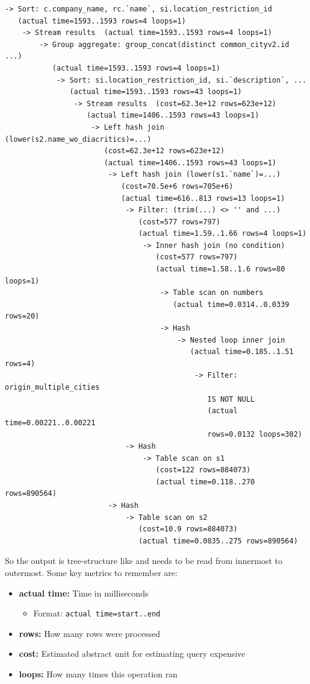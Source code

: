 \documentclass[11pt]{article}
\begin{document}
\begin{verbatim}
-> Sort: c.company_name, rc.`name`, si.location_restriction_id
   (actual time=1593..1593 rows=4 loops=1)
    -> Stream results  (actual time=1593..1593 rows=4 loops=1)
        -> Group aggregate: group_concat(distinct common_cityv2.id ...)
           (actual time=1593..1593 rows=4 loops=1)
            -> Sort: si.location_restriction_id, si.`description`, ...
               (actual time=1593..1593 rows=43 loops=1)
                -> Stream results  (cost=62.3e+12 rows=623e+12)
                   (actual time=1406..1593 rows=43 loops=1)
                    -> Left hash join (lower(s2.name_wo_diacritics)=...)
                       (cost=62.3e+12 rows=623e+12)
                       (actual time=1406..1593 rows=43 loops=1)
                        -> Left hash join (lower(s1.`name`)=...)
                           (cost=70.5e+6 rows=705e+6)
                           (actual time=616..813 rows=13 loops=1)
                            -> Filter: (trim(...) <> '' and ...)
                               (cost=577 rows=797)
                               (actual time=1.59..1.66 rows=4 loops=1)
                                -> Inner hash join (no condition)
                                   (cost=577 rows=797)
                                   (actual time=1.58..1.6 rows=80 loops=1)
                                    -> Table scan on numbers
                                       (actual time=0.0314..0.0339 rows=20)
                                    -> Hash
                                        -> Nested loop inner join
                                           (actual time=0.185..1.51 rows=4)
                                            -> Filter: origin_multiple_cities
                                               IS NOT NULL
                                               (actual time=0.00221..0.00221
                                               rows=0.0132 loops=302)
                            -> Hash
                                -> Table scan on s1
                                   (cost=122 rows=884073)
                                   (actual time=0.118..270 rows=890564)
                        -> Hash
                            -> Table scan on s2
                               (cost=10.9 rows=884073)
                               (actual time=0.0835..275 rows=890564)
\end{verbatim}

So the output is tree-structure like and needs to be read from innermost to outermost. Some key metrics to remember are:
\begin{itemize}
    \item \textbf{actual time:} Time in milliseconds
    \begin{itemize}
        \item Format: \texttt{actual time=start..end}
    \end{itemize}
    \item \textbf{rows:} How many rows were processed
    \item \textbf{cost:} Estimated abstract unit for estimating query expensive
    \item \textbf{loops:} How many times this operation ran
\end{itemize}
\end{document}
